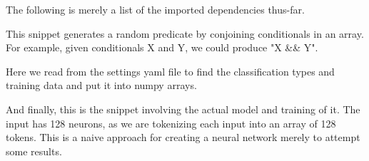 \documentclass{article}
\begin{document}
    The following is merely a list of the imported dependencies thus-far.
    

    This snippet generates a random predicate by conjoining conditionals in an array.
    For example, given conditionals X and Y, we could produce "X \&\& Y".
    

    Here we read from the settings yaml file to find the classification types and training data and put it into numpy arrays.
    

    And finally, this is the snippet involving the actual model and training of it.
    The input has 128 neurons, as we are tokenizing each input into an array of 128 tokens.
    This is a naive approach for creating a neural network merely to attempt some results.
    

    

    

    
\end{document}
